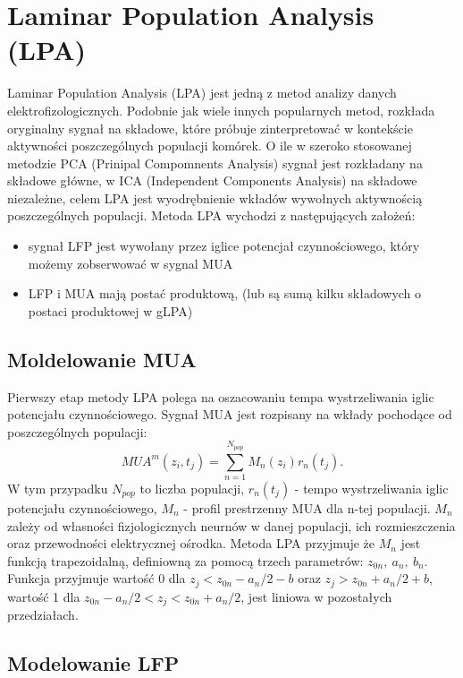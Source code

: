 \section{Laminar Population Analysis (LPA)}
Laminar Population Analysis (LPA) \cite{Einevoll2007} jest jedną z metod analizy danych elektrofizologicznych. Podobnie jak wiele innych popularnych metod, rozkłada oryginalny sygnał na składowe, które próbuje zinterpretować w kontekście aktywności poszczególnych populacji komórek. O ile w szeroko stosowanej metodzie PCA (Prinipal Compomnents Analysis) sygnał jest rozkładany na składowe główne, w ICA (Independent Components Analysis) na składowe niezależne, celem LPA jest wyodrębnienie wkładów wywołnych aktywnością poszczególnych populacji. Metoda LPA wychodzi z następujących założeń:
\begin{itemize}
\item sygnał LFP jest wywołany przez iglice potencjał czynnościowego, który możemy zobserwować w sygnal MUA
\item LFP i MUA mają postać produktową,  (lub są sumą kilku składowych o postaci produktowej w gLPA)
\end{itemize}
\subsection{Moldelowanie MUA}
Pierwszy etap metody LPA polega na oszacowaniu tempa wystrzeliwania iglic potencjału czynnościowego. Sygnał MUA jest rozpisany na wkłady pochodące od poszczególnych populacji:
\begin{equation}
MUA^m(z_i, t_j) = \sum^{N_{pop}}_{n=1} M_n(z_i)r_n(t_j).
\label{MUAdecomposition}
\end{equation}
W tym przypadku $N_{pop}$ to liczba populacji, $r_n(t_j)$ - tempo wystrzeliwania iglic potencjału czynnościowego,  $M_n$ - profil prestrzenny MUA dla n-tej populacji. $M_n$ zależy od własności fizjologicznych neurnów w danej populacji, ich rozmieszczenia oraz przewodności elektrycznej ośrodka. Metoda LPA przyjmuje że $M_n$ jest funkcją trapezoidalną, definiowną za pomocą trzech parametrów: $z_{0n}, \ a_n, \ b_n$. Funkcja przyjmuje wartość 0 dla $z_{j}< z_{0n} - a_n/2 - b$ oraz $z_{j} > z_{0n} + a_n/2 + b$, wartość 1 dla $z_{0n} - a_n/2 < z_j < z_{0n} + a_n/2$, jest liniowa w pozostałych przedziałach.

 

\subsection{Modelowanie LFP}

